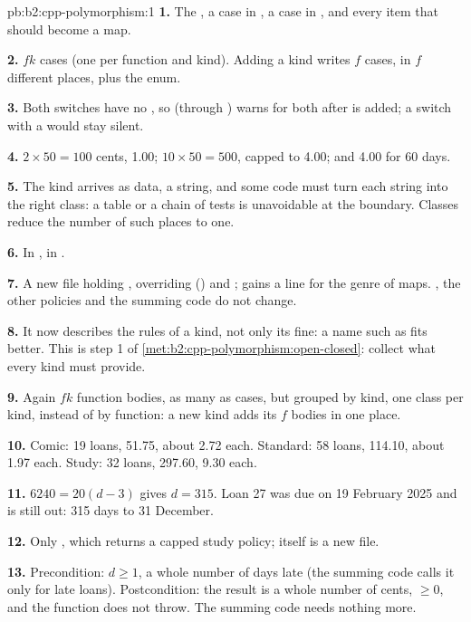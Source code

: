 \begin{solution}{pb:b2:cpp-polymorphism:1}
\textbf{1.} The , a case in , a case in , and every item that should
become a map.

\textbf{2.} $fk$ cases (one per function and kind). Adding a kind writes $f$ cases, in $f$ different places, plus the
enum.

\textbf{3.} Both switches have no , so  (through ) warns for both after
 is added; a switch with a  would stay silent.

\textbf{4.} $2 \times 50 = 100$ cents, 1.00; $10 \times 50 = 500$, capped to 4.00; and 4.00 for 60 days.

\textbf{5.} The kind arrives as data, a string, and some code must turn each string into the right class: a table or
a chain of tests is unavoidable at the boundary. Classes reduce the number of such places to one.

\textbf{6.} In , in .

\textbf{7.} A new file holding , overriding  () and
;  gains a line for the genre of maps. , the other policies and the
summing code do not change.

\textbf{8.} It now describes the rules of a kind, not only its fine: a name such as  fits better. This
is step 1 of \cref{met:b2:cpp-polymorphism:open-closed}: collect what every kind must provide.

\textbf{9.} Again $fk$ function bodies, as many as cases, but grouped by kind, one class per kind, instead of by
function: a new kind adds its $f$ bodies in one place.

\textbf{10.} Comic: 19 loans, 51.75, about 2.72 each. Standard: 58 loans, 114.10, about 1.97 each. Study: 32 loans,
297.60, 9.30 each.

\textbf{11.} $6240 = 20(d - 3)$ gives $d = 315$. Loan 27 was due on 19 February 2025 and is still out: 315 days to 31
December.

\textbf{12.} Only , which returns a capped study policy;  itself is a new file.

\textbf{13.} Precondition: $d \geq 1$, a whole number of days late (the summing code calls it only for late loans).
Postcondition: the result is a whole number of cents, $\geq 0$, and the function does not throw. The summing code
needs nothing more.


\end{solution}
